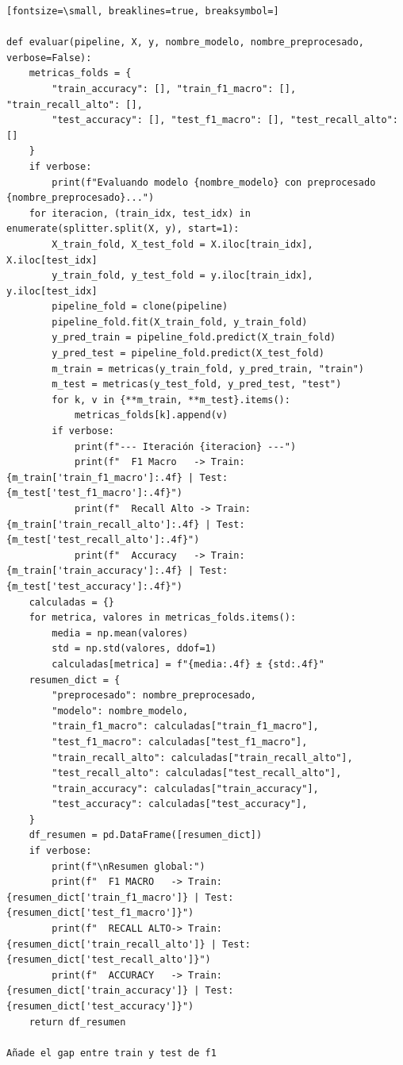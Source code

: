\documentclass[12pt,a4paper,oneside]{book}
\begin{document}
\begin{iaprompt}
\begin{Verbatim}[fontsize=\small, breaklines=true, breaksymbol=]

def evaluar(pipeline, X, y, nombre_modelo, nombre_preprocesado, verbose=False):
    metricas_folds = {
        "train_accuracy": [], "train_f1_macro": [], "train_recall_alto": [],
        "test_accuracy": [], "test_f1_macro": [], "test_recall_alto": []
    }
    if verbose:
        print(f"Evaluando modelo {nombre_modelo} con preprocesado {nombre_preprocesado}...")
    for iteracion, (train_idx, test_idx) in enumerate(splitter.split(X, y), start=1):
        X_train_fold, X_test_fold = X.iloc[train_idx], X.iloc[test_idx]
        y_train_fold, y_test_fold = y.iloc[train_idx], y.iloc[test_idx]
        pipeline_fold = clone(pipeline)
        pipeline_fold.fit(X_train_fold, y_train_fold)
        y_pred_train = pipeline_fold.predict(X_train_fold)
        y_pred_test = pipeline_fold.predict(X_test_fold)
        m_train = metricas(y_train_fold, y_pred_train, "train")
        m_test = metricas(y_test_fold, y_pred_test, "test")
        for k, v in {**m_train, **m_test}.items():
            metricas_folds[k].append(v)
        if verbose:
            print(f"--- Iteración {iteracion} ---")
            print(f"  F1 Macro   -> Train: {m_train['train_f1_macro']:.4f} | Test: {m_test['test_f1_macro']:.4f}")
            print(f"  Recall Alto -> Train: {m_train['train_recall_alto']:.4f} | Test: {m_test['test_recall_alto']:.4f}")
            print(f"  Accuracy   -> Train: {m_train['train_accuracy']:.4f} | Test: {m_test['test_accuracy']:.4f}")
    calculadas = {}
    for metrica, valores in metricas_folds.items():
        media = np.mean(valores)
        std = np.std(valores, ddof=1)
        calculadas[metrica] = f"{media:.4f} ± {std:.4f}"
    resumen_dict = {
        "preprocesado": nombre_preprocesado,
        "modelo": nombre_modelo,
        "train_f1_macro": calculadas["train_f1_macro"],
        "test_f1_macro": calculadas["test_f1_macro"],
        "train_recall_alto": calculadas["train_recall_alto"],
        "test_recall_alto": calculadas["test_recall_alto"],
        "train_accuracy": calculadas["train_accuracy"],
        "test_accuracy": calculadas["test_accuracy"],
    }
    df_resumen = pd.DataFrame([resumen_dict])
    if verbose:
        print(f"\nResumen global:")
        print(f"  F1 MACRO   -> Train: {resumen_dict['train_f1_macro']} | Test: {resumen_dict['test_f1_macro']}")
        print(f"  RECALL ALTO-> Train: {resumen_dict['train_recall_alto']} | Test: {resumen_dict['test_recall_alto']}")
        print(f"  ACCURACY   -> Train: {resumen_dict['train_accuracy']} | Test: {resumen_dict['test_accuracy']}")
    return df_resumen

Añade el gap entre train y test de f1
\end{Verbatim}
\end{iaprompt}
\end{document}

